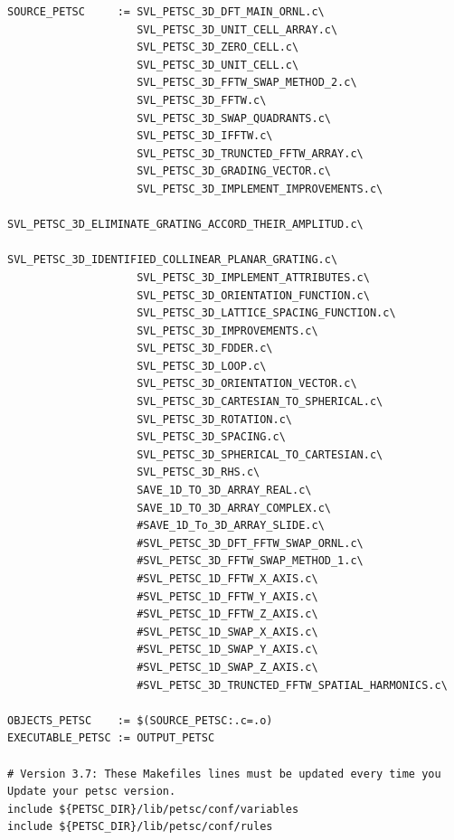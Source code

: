 \documentclass{article}
\begin{document}
\begin{enumerate}
\begin{verbatim}
SOURCE_PETSC     := SVL_PETSC_3D_DFT_MAIN_ORNL.c\
                    SVL_PETSC_3D_UNIT_CELL_ARRAY.c\
                    SVL_PETSC_3D_ZERO_CELL.c\
                    SVL_PETSC_3D_UNIT_CELL.c\
                    SVL_PETSC_3D_FFTW_SWAP_METHOD_2.c\
                    SVL_PETSC_3D_FFTW.c\
                    SVL_PETSC_3D_SWAP_QUADRANTS.c\
                    SVL_PETSC_3D_IFFTW.c\
                    SVL_PETSC_3D_TRUNCTED_FFTW_ARRAY.c\
                    SVL_PETSC_3D_GRADING_VECTOR.c\
                    SVL_PETSC_3D_IMPLEMENT_IMPROVEMENTS.c\
                    SVL_PETSC_3D_ELIMINATE_GRATING_ACCORD_THEIR_AMPLITUD.c\
                    SVL_PETSC_3D_IDENTIFIED_COLLINEAR_PLANAR_GRATING.c\
                    SVL_PETSC_3D_IMPLEMENT_ATTRIBUTES.c\
                    SVL_PETSC_3D_ORIENTATION_FUNCTION.c\
                    SVL_PETSC_3D_LATTICE_SPACING_FUNCTION.c\
                    SVL_PETSC_3D_IMPROVEMENTS.c\
                    SVL_PETSC_3D_FDDER.c\
                    SVL_PETSC_3D_LOOP.c\
                    SVL_PETSC_3D_ORIENTATION_VECTOR.c\
                    SVL_PETSC_3D_CARTESIAN_TO_SPHERICAL.c\
                    SVL_PETSC_3D_ROTATION.c\
                    SVL_PETSC_3D_SPACING.c\
                    SVL_PETSC_3D_SPHERICAL_TO_CARTESIAN.c\
                    SVL_PETSC_3D_RHS.c\
                    SAVE_1D_TO_3D_ARRAY_REAL.c\
                    SAVE_1D_TO_3D_ARRAY_COMPLEX.c\
                    #SAVE_1D_To_3D_ARRAY_SLIDE.c\
                    #SVL_PETSC_3D_DFT_FFTW_SWAP_ORNL.c\
                    #SVL_PETSC_3D_FFTW_SWAP_METHOD_1.c\
                    #SVL_PETSC_1D_FFTW_X_AXIS.c\
                    #SVL_PETSC_1D_FFTW_Y_AXIS.c\
                    #SVL_PETSC_1D_FFTW_Z_AXIS.c\
                    #SVL_PETSC_1D_SWAP_X_AXIS.c\
                    #SVL_PETSC_1D_SWAP_Y_AXIS.c\
                    #SVL_PETSC_1D_SWAP_Z_AXIS.c\
                    #SVL_PETSC_3D_TRUNCTED_FFTW_SPATIAL_HARMONICS.c\

OBJECTS_PETSC    := $(SOURCE_PETSC:.c=.o)
EXECUTABLE_PETSC := OUTPUT_PETSC

# Version 3.7: These Makefiles lines must be updated every time you Update your petsc version.
include ${PETSC_DIR}/lib/petsc/conf/variables
include ${PETSC_DIR}/lib/petsc/conf/rules


\end{verbatim}
\end{enumerate}
\end{document}
